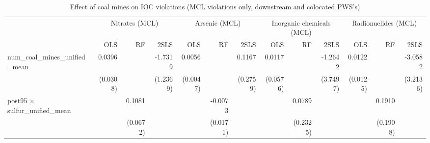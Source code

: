 
\begin{table}[htbp]
   
   \caption{\label{2sls_dwnstrmcolocate_minevio_mcl} Effect of coal mines on IOC violations (MCL violations only, downstream and colocated PWS's)}
   \bigskip
   
   \centering
   
   \begin{adjustbox}{width = \textwidth, center}
      
      
      \begin{tabular}{lrrrrrrrrrrrr}
         \toprule
         
          & \multicolumn{3}{c}{Nitrates (MCL)} & \multicolumn{3}{c}{Arsenic (MCL)} & \multicolumn{3}{c}{Inorganic chemicals (MCL)} & \multicolumn{3}{c}{Radionuclides (MCL)}\\
         
                                                                            & OLS                   & RF       & 2SLS     & OLS                   & RF                    & 2SLS                  & OLS                   & RF                    & 2SLS                  & OLS                   & RF       & 2SLS\\  
         
         \midrule 
         num\_coal\_mines\_unified\_mean                                    & 0.0396                &          & -1.7319  & 0.0056                &                       & 0.1167                & 0.0117                &                       & -1.2642               & 0.0122                &          & -3.0582\\   
                                                                            & (0.0308)              &          & (1.2369) & (0.0047)              &                       & (0.2759)              & (0.0576)              &                       & (3.7497)              & (0.0125)              &          & (3.2136)\\   
         post95 $\times$ sulfur\_unified\_mean                              &                       & 0.1081   &          &                       & -0.0073               &                       &                       & 0.0789                &                       &                       & 0.1910   &   \\   
                                                                            &                       & (0.0672) &          &                       & (0.0171)              &                       &                       & (0.2325)              &                       &                       & (0.1908) &   \\   
         

\end{tabular}
\end{adjustbox}
\end{table}
